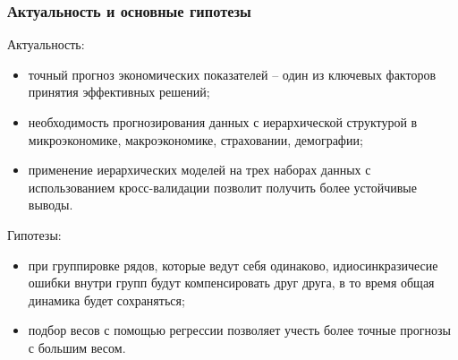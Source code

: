 \documentclass[c, dvipsnames]{beamer}  %
\begin{document}
\begin{frame}[shrink=3]

\frametitle{Актуальность и основные гипотезы} 




\begin{block}{Актуальность:}
	\begin{itemize}
		
		\item  точный прогноз экономических показателей – один из ключевых факторов принятия эффективных решений;
		
		\item  необходимость прогнозирования данных с иерархической структурой в микроэкономике, макроэкономике, страховании, демографии;
		
		\item  применение иерархических моделей на трех наборах данных с использованием кросс-валидации позволит получить более устойчивые выводы.
		
	\end{itemize}
	
\end{block}

\begin{block}{Гипотезы:}
	\begin{itemize}
		\item  при группировке рядов, которые ведут себя одинаково, идиосинкразичесие ошибки внутри групп будут компенсировать друг друга, в то время общая динамика будет сохраняться;
		
		\item  подбор весов с помощью регрессии позволяет учесть более точные прогнозы с большим весом. 
	\end{itemize}
	
\end{block}
\end{frame}
\end{document}
